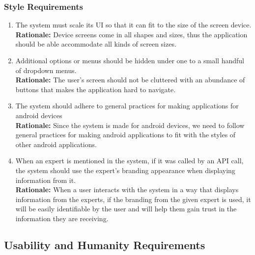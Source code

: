 \documentclass[]{article}
\begin{document}
\subsubsection{Style Requirements}
\label{ssub:style_requirements}
\begin{enumerate}[label={LF-S\arabic*.}]
	\item The system must scale its UI so that it can fit to the size of the screen device.\\
	\textbf{Rationale:} Device screens come in all shapes and sizes, thus the application should be able accommodate all kinds of screen sizes.
	\item Additional options or menus should be hidden under one to a small handful of dropdown menus.\\
	\textbf{Rationale:} The user's screen should not be cluttered with an abundance of buttons that makes the application hard to navigate.
	\item The system should adhere to general practices for making applications for android devices\\
	\textbf{Rationale:} Since the system is made for android devices, we need to follow general practices for making android applications to fit with the styles of other android applications.
	\item When an expert is mentioned in the system, if it was called by an API call, the system should use the expert's branding appearance when displaying information from it.\\
	\textbf{Rationale:} When a user interacts with the system in a way that displays information from the experts, if the branding from the given expert is used, it will be easily identifiable by the user and will help them gain trust in the information they are receiving.

\end{enumerate}


\subsection{Usability and Humanity Requirements}
\label{sub:usability_and_humanity_requirements}
\end{document}
